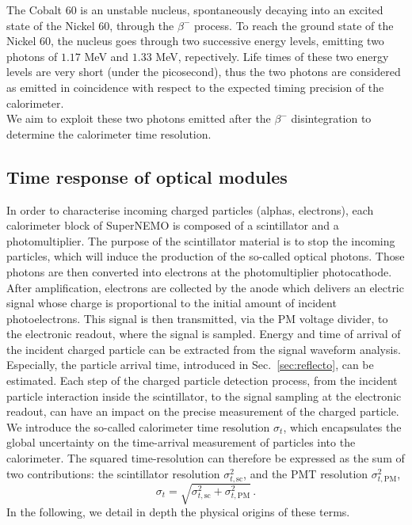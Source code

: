 The Cobalt $60$ is an unstable nucleus, spontaneously decaying into an excited state of the Nickel $60$, through the $\beta^{-}$ process.
To reach the ground state of the Nickel $60$, the nucleus goes through two successive energy levels, emitting two photons of $1.17$ MeV and $1.33$ MeV, repectively.
Life times of these two energy levels are very short (under the picosecond), thus the two photons are considered as emitted in coincidence with respect to the expected timing precision of the calorimeter.\\
\newline
We aim to exploit these two photons emitted after the $\beta^{-}$ disintegration to determine the calorimeter time resolution.

\subsection{Time response of optical modules}
\label{subsec:OMtimeResponse}

In order to characterise incoming charged particles (alphas, electrons), each calorimeter block of SuperNEMO is composed of a scintillator and a photomultiplier.
The purpose of the scintillator material is to stop the incoming particles, which will induce the production of the so-called optical photons.
Those photons are then converted into electrons at the photomultiplier photocathode.
After amplification, electrons are collected by the anode which delivers an electric signal whose charge is proportional to the initial amount of incident photoelectrons.
This signal is then transmitted, via the PM voltage divider, to the electronic readout, where the signal is sampled.
Energy and time of arrival of the incident charged particle can be extracted from the signal waveform analysis.
Especially, the particle arrival time, introduced in Sec.~\ref{sec:reflecto}, can be estimated.
Each step of the charged particle detection process, from the incident particle interaction inside the scintillator, to the signal sampling at the electronic readout, can have an impact on the precise measurement of the charged particle.
We introduce the so-called calorimeter time resolution $\sigma_t$, which encapsulates the global uncertainty on the time-arrival measurement of particles into the calorimeter.
The squared time-resolution can therefore be expressed as the sum of two contributions:
the scintillator resolution $\sigma_{t, \textrm{sc}}^{2}$, and the PMT resolution $\sigma_{t, \textrm{PM}}^{2}$,
\begin{equation}
  \sigma_{t}=\sqrt{\sigma_{t,\text{sc}}^{2}+\sigma_{t,\text{PM}}^{2}}\,.
  \label{eq:Co_sigma_t}
\end{equation}
In the following, we detail in depth the physical origins of these terms.

